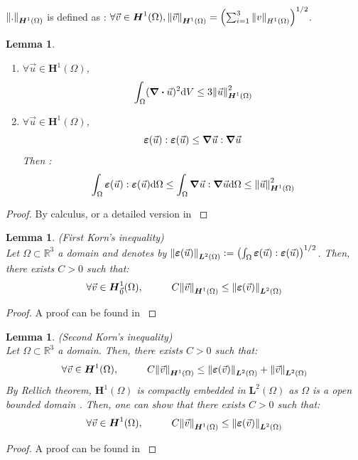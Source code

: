 \documentclass[a4paper,12pt,twoside]{report}
\newcommand{\mtr}{\mathbb{R}}
\newcommand{\dif}{\mathrm{d}}
\newtheorem{lemma}[theorem]{Lemma}
\begin{document}
$\norm{.}_{\boldsymbol H^1(\Omega)}$ is defined as : $\forall \vec v \in \boldsymbol H^1(\Omega), \norm{\vec v}_{\boldsymbol H^1(\Omega)} = \left(\sum_{i=1}^3 \norm{v}_{H^1(\Omega)} \right)^{1/2}$. 
\begin{lemma}
\begin{enumerate}
    \item $\displaystyle \forall \vec u \in \boldsymbol H^1(\Omega)$, $$\int_\Omega (\div \vec u)^2 \dif V \leq 3 \norm{\vec u}_{\boldsymbol H^1(\Omega)}^2$$
    \item $\displaystyle \forall \vec u \in \boldsymbol H^1(\Omega)$,$$\boldsymbol \varepsilon(\vec u) : \boldsymbol \varepsilon(\vec u) \leq \grad \vec u : \grad \vec u$$
    Then : $$\int_\Omega \boldsymbol \varepsilon(\vec u) : \boldsymbol \varepsilon(\vec u) \dif\Omega \leq \int_\Omega \grad \vec u : \grad \vec u \dif \Omega \leq \norm{\vec u}_{\boldsymbol H^1(\Omega)}^2$$
\end{enumerate}
\end{lemma}
\begin{proof}
    By calculus, or a detailed version in \cite{cinatl_finite}
\end{proof}

\begin{lemma}
\label{Korn1}
    (First Korn's inequality) \\
    Let $\Omega \subset \mtr^3$ a domain and denotes by $\norm{\boldsymbol \varepsilon(\vec u)}_{\boldsymbol L^2(\Omega)} := \left(\int_\Omega \boldsymbol \varepsilon(\vec u):\boldsymbol \varepsilon(\vec u)\right)^{1/2}$. Then, there exists $C > 0$ such that: $$\forall \vec v \in \boldsymbol H^1_{\vec 0}(\Omega), \hspace{1cm} C\norm{\vec v}_{\boldsymbol H^1(\Omega)} \leq \norm{\boldsymbol \varepsilon(\vec v)}_{\boldsymbol L^2(\Omega)}$$
\end{lemma}
\begin{proof}
    A proof can be found in \cite{brenner_mathematical_2008}
\end{proof}

\begin{lemma}
\label{Korn2}
    (Second Korn's inequality) \\
    Let $\Omega \subset \mtr^3$ a domain. Then, there exists $C > 0$ such that: 
    $$\forall \vec v \in \boldsymbol H^1(\Omega), \hspace{1cm} C\norm{\vec v}_{\boldsymbol H^1(\Omega)} \leq \norm{\boldsymbol \varepsilon(\vec v)}_{\boldsymbol L^2(\Omega)} + \norm{\vec v}_{\boldsymbol L^2(\Omega)}$$
    By Rellich theorem, $\boldsymbol H^1(\Omega)$ is compactly embedded in $\boldsymbol L^2(\Omega)$ as $\Omega$ is a open bounded domain . Then, one can show that there exists $C > 0$ such that:
    $$\forall \vec v \in \boldsymbol H^1(\Omega), \hspace{1cm} C\norm{\vec v}_{\boldsymbol H^1(\Omega)} \leq \norm{\boldsymbol \varepsilon(\vec v)}_{\boldsymbol L^2(\Omega)}$$
\end{lemma}
\begin{proof}
    A proof can be found in \cite{brenner_mathematical_2008}
\end{proof}
\end{document}
